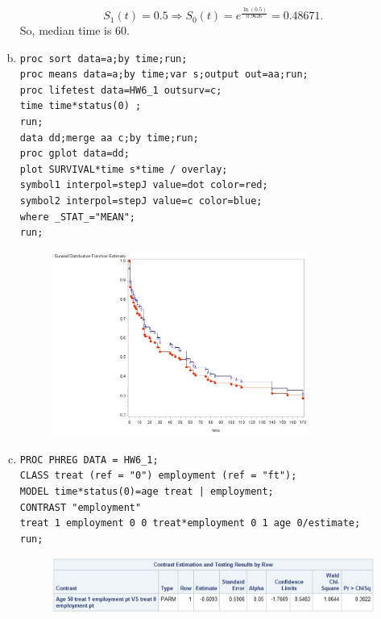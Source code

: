\documentclass{elegantbook}
\begin{document}
\begin{solution}
\begin{enumerate}[(a)]
        \[S_1(t)=0.5\Rightarrow S_0(t)=e^{\frac{\ln(0.5)}{0.9626}}=0.48671. \]
        So, median time is 60. 
        \item \begin{verbatim}
proc sort data=a;by time;run;
proc means data=a;by time;var s;output out=aa;run;
proc lifetest data=HW6_1 outsurv=c;
time time*status(0) ;
run;
data dd;merge aa c;by time;run;
proc gplot data=dd;
plot SURVIVAL*time s*time / overlay;
symbol1 interpol=stepJ value=dot color=red;
symbol2 interpol=stepJ value=c color=blue;
where _STAT_="MEAN";
run;
        \end{verbatim}
        \begin{figure}[H]
            \centering
            \includegraphics[width=0.8\textwidth]{HW6_2.png}
        \end{figure}
        \item \begin{verbatim}
PROC PHREG DATA = HW6_1;
CLASS treat (ref = "0") employment (ref = "ft");
MODEL time*status(0)=age treat | employment;
CONTRAST "employment"
treat 1 employment 0 0 treat*employment 0 1 age 0/estimate;
run;
        \end{verbatim}
        \begin{figure}[H]
            \centering
            \includegraphics[width=.6\textwidth]{HW6_3.png}
        \end{figure}

\end{enumerate}
\end{solution}
\end{document}
